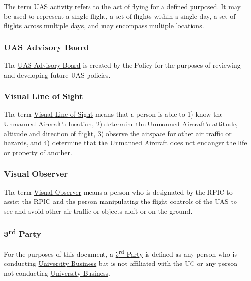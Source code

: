 \documentclass[
]{book}
\begin{document}
The term \protect\hyperlink{UASactivity}{UAS activity} refers to the act of flying for a defined purposed. It may be used to represent a single flight, a set of flights within a single day, a set of flights across multiple days, and may encompass multiple locations.



\hypertarget{AB}{%
\subsubsection*{UAS Advisory Board}\label{AB}}

The \protect\hyperlink{AB}{UAS Advisory Board} is created by the Policy for the purposes of reviewing and developing future \protect\hyperlink{UAS}{UAS} policies.



\hypertarget{VLOS}{%
\subsubsection*{Visual Line of Sight}\label{VLOS}}

The term \protect\hyperlink{VLOS}{Visual Line of Sight} means that a person is able to 1) know the \protect\hyperlink{UA}{Unmanned Aircraft}'s location, 2) determine the \protect\hyperlink{UA}{Unmanned Aircraft}'s attitude, altitude and direction of flight, 3) observe the airspace for other air traffic or hazards, and 4) determine that the \protect\hyperlink{UA}{Unmanned Aircraft} does not endanger the life or property of another.





\hypertarget{VO}{%
\subsubsection*{Visual Observer}\label{VO}}

The term \protect\hyperlink{VO}{Visual Observer} means a person who is designated by the RPIC to assist the RPIC and the person manipulating the flight controls of the UAS to see and avoid other air traffic or objects aloft or on the ground.





\hypertarget{rdparty}{%
\subsubsection*{\texorpdfstring{3\textsuperscript{rd} Party}{3rd Party}}\label{rdparty}}

For the purposes of this document, a \protect\hyperlink{rdparty}{3\textsuperscript{rd} Party} is defined as any person who is conducting \protect\hyperlink{UB}{University Business} but is not affiliated with the UC or any person not conducting \protect\hyperlink{UB}{University Business}.



  
\end{document}
